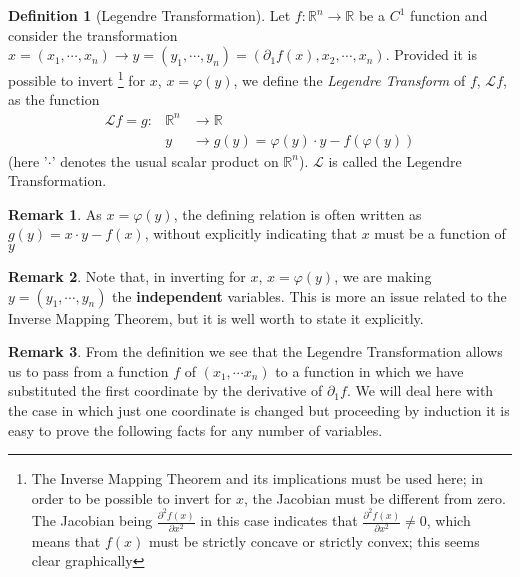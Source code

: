 \documentclass[12pt]{article}
\theoremstyle{definition}
\newtheorem{defn}{Definition}
\newtheorem{rem}{Remark}
\numberwithin{equation}{section}
\newcommand{\R}{\mathbb R}
\newcommand{\To}{\longrightarrow}
\begin{document}
\begin{defn}[Legendre Transformation]
Let $f:\R^n \To \R$ be a $C^1$ function and consider the
transformation $x=\left(x_1,\cdots, x_n \right) \To
y=\left(y_1,\cdots, y_n \right)=\left(
\partial_1 f(x), x_2, \cdots, x_n \right)$. Provided it is
possible to invert \footnote{The Inverse Mapping Theorem and its
implications must be used here; in order to be possible to invert
for $x$, the Jacobian must be different from zero. The Jacobian
being $\frac{\partial^2 f(x)}{\partial x^2}$ in this case indicates
that $\frac{\partial^2 f(x)}{\partial x^2} \neq 0$, which means that
$f(x)$ must be strictly concave or strictly convex; this seems clear
graphically } for $x$, $x=\varphi(y)$, we define the \emph{Legendre
Transform} of $f$, $\mathcal L f$, as the function
\begin{eqnarray}
\nonumber \mathcal L f=g: & \R^n & \To \R  \\ \nonumber &y& \To
g(y)=\varphi(y) \cdot y - f(\varphi(y))
\end{eqnarray}(here '$\cdot$' denotes the usual scalar product on $\R^n$).
$\mathcal L$ is called the Legendre Transformation.

\end{defn}

\medskip

\begin{rem}
\noindent As $x=\varphi(y)$, the defining relation is often written
as $g(y)=x \cdot y - f(x)$, without explicitly indicating that $x$
must be a function of $y$
\end{rem}

\medskip

\begin{rem}
\noindent Note that, in inverting for $x$, $x=\varphi(y)$, we are
making $y=(y_1, \cdots, y_n)$ the \textbf{independent} variables.
This is more an issue related to the Inverse Mapping Theorem, but it
is well worth to state it explicitly.
\end{rem}

\medskip

\begin{rem}
\noindent From the definition we see that the Legendre
Transformation allows us to pass from a function $f$ of $(x_1,
\cdots x_n)$ to a function in which we have substituted the first
coordinate by the derivative of $\partial_1 f$. We will deal here
with the case in which just one coordinate is changed but proceeding
by induction it is easy to prove the following facts for any number
of variables.
\end{rem}
\end{document}
